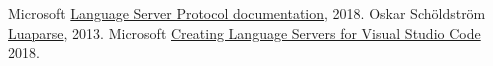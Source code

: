  Microsoft \href{https://microsoft.github.io/language-server-protocol/specification#initialize}{Language Server Protocol documentation}, 2018.
 Oskar Schöldström \href{https://oxyc.github.io/luaparse/}{Luaparse}, 2013.
 Microsoft \href{https://code.visualstudio.com/docs/extensions/example-language-server}{Creating Language Servers for Visual Studio Code} 2018.